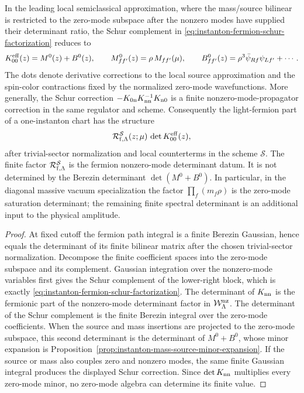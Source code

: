 \begin{proposition}
In the leading local semiclassical approximation, where the mass/source
bilinear is restricted to the zero-mode subspace after the nonzero modes have
supplied their determinant ratio, the Schur complement in
\eqref{eq:instanton-fermion-schur-factorization} reduces to
\begin{equation}
  K_{00}^{\rm eff}(z)
  =
  M^{0}(z)+B^{0}(z),
  \qquad
  M^{0}_{ff'}(z)=\rho\,M_{ff'}(\mu),
  \qquad
  B^{0}_{ff'}(z)=\rho^3\bar\psi_{Rf}\psi_{Lf'}+\cdots .
  \label{eq:instanton-zero-mode-effective-matrix}
\end{equation}
The dots denote derivative corrections to the local source approximation and
the spin-color contractions fixed by the normalized zero-mode wavefunctions.
More generally, the Schur correction
\(-K_{0{\rm n}}K_{{\rm nn}}^{-1}K_{{\rm n}0}\) is a finite
nonzero-mode-propagator correction in the same regulator and scheme.
Consequently the light-fermion part of a one-instanton chart has the
structure
\begin{equation}
  \mathcal R_{{\rm f},\Lambda}^{\mathcal S}(z;\mu)\,
  \det K_{00}^{\rm eff}(z),
  \label{eq:instanton-fermion-nonzero-zero-factor}
\end{equation}
after trivial-sector normalization and local counterterms in the scheme
\(\mathcal S\).  The finite factor
\(\mathcal R_{{\rm f},\Lambda}^{\mathcal S}\) is the fermion nonzero-mode
determinant datum.  It is not determined by the Berezin determinant
\(\det(M^{0}+B^{0})\).  In particular, in the diagonal massive vacuum
specialization the factor \(\prod_f(m_f\rho)\) is the zero-mode saturation
determinant; the remaining finite spectral determinant is an additional
input to the physical amplitude.
\end{proposition}

\begin{proof}
At fixed cutoff the fermion path integral is a finite Berezin Gaussian, hence
equals the determinant of its finite bilinear matrix after the chosen
trivial-sector normalization.  Decompose the finite coefficient spaces into
the zero-mode subspace and its complement.  Gaussian integration over the
nonzero-mode variables first gives the Schur complement of the lower-right
block, which is exactly
\eqref{eq:instanton-fermion-schur-factorization}.  The determinant of
\(K_{{\rm nn}}\) is the fermionic part of the nonzero-mode determinant factor
in \(\mathcal W_{\Lambda}^{\rm nz}\).  The determinant of the Schur
complement is the finite Berezin integral over the zero-mode coefficients.
When the source and mass insertions are projected to the zero-mode subspace,
this second determinant is the determinant of \(M^0+B^0\), whose minor
expansion is Proposition~\ref{prop:instanton-mass-source-minor-expansion}.
If the source or mass also couples zero and nonzero modes, the same finite
Gaussian integral produces the displayed Schur correction.  Since
\(\det K_{{\rm nn}}\) multiplies every zero-mode minor, no zero-mode algebra
can determine its finite value.
\end{proof}

